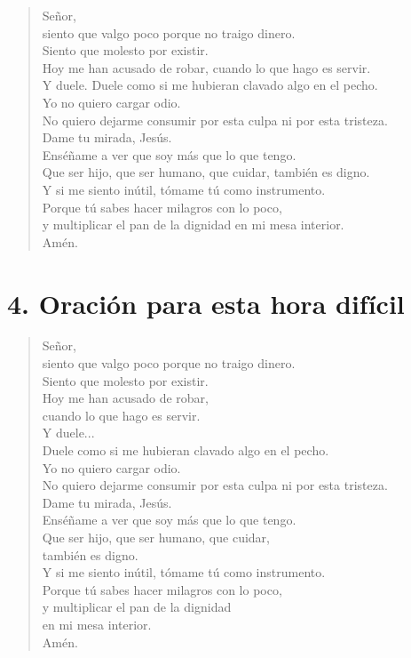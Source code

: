 \documentclass[12pt]{article}
\begin{document}
	\begin{verse}
		Señor,\\
		siento que valgo poco porque no traigo dinero.\\
		Siento que molesto por existir.\\
		
		Hoy me han acusado de robar, cuando lo que hago es servir.\\
		Y duele. Duele como si me hubieran clavado algo en el pecho.\\
		
		Yo no quiero cargar odio.\\
		No quiero dejarme consumir por esta culpa ni por esta tristeza.\\
		
		Dame tu mirada, Jesús.\\
		Enséñame a ver que soy más que lo que tengo.\\
		Que ser hijo, que ser humano, que cuidar, también es digno.\\
		
		Y si me siento inútil, tómame tú como instrumento.\\
		Porque tú sabes hacer milagros con lo poco,\\
		y multiplicar el pan de la dignidad en mi mesa interior.\\
		Amén.
	\end{verse}
	
	\section*{4. Oración para esta hora difícil}
	\begin{verse}
			
	Señor, \\
	siento que valgo poco porque no traigo dinero. \\
	Siento que molesto por existir. \\
	
	Hoy me han acusado de robar, \\
	cuando lo que hago es servir.\\
	Y duele...\\ Duele como si me hubieran clavado algo en el pecho. \\
	
	Yo no quiero cargar odio.\\
	No quiero dejarme consumir por esta culpa ni por esta tristeza. \\
	
	Dame tu mirada, Jesús. \\
	Enséñame a ver que soy más que lo que tengo.\\
	Que ser hijo, que ser humano, que cuidar,\\
	también es digno. 
	\\	
	Y si me siento inútil, tómame tú como instrumento.\\
	Porque tú sabes hacer milagros con lo poco,\\
	y multiplicar el pan de la dignidad\\ en mi mesa interior. \\ 
	
\hfill	Amén.
\end{verse}
\end{document}
